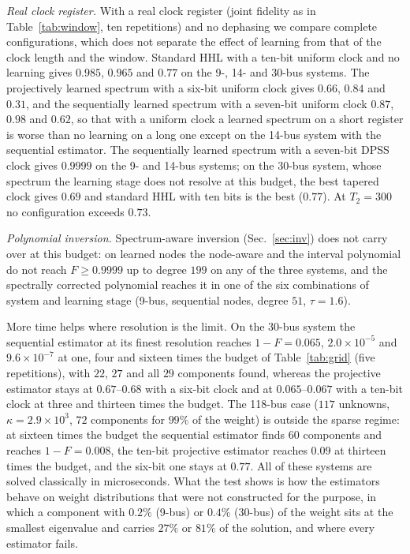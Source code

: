 \documentclass[journal]{IEEEtran}
\begin{document}
\emph{Real clock register.} With a real clock register (joint fidelity as in Table~\ref{tab:window}, ten repetitions) and no dephasing we compare complete configurations, which does not separate the effect of learning from that of the clock length and the window. Standard HHL with a ten-bit uniform clock and no learning gives $0.985$, $0.965$ and $0.77$ on the 9-, 14- and 30-bus systems. The projectively learned spectrum with a six-bit uniform clock gives $0.66$, $0.84$ and $0.31$, and the sequentially learned spectrum with a seven-bit uniform clock $0.87$, $0.98$ and $0.62$, so that with a uniform clock a learned spectrum on a short register is worse than no learning on a long one except on the 14-bus system with the sequential estimator. The sequentially learned spectrum with a seven-bit DPSS clock gives $0.9999$ on the 9- and 14-bus systems; on the 30-bus system, whose spectrum the learning stage does not resolve at this budget, the best tapered clock gives $0.69$ and standard HHL with ten bits is the best ($0.77$). At $T_2=300$ no configuration exceeds $0.73$.

\begin{sloppypar}
\emph{Polynomial inversion.} Spectrum-aware inversion (Sec.~\ref{sec:inv}) does not carry over at this budget: on learned nodes the node-aware and the interval polynomial do not reach $F\ge0.9999$ up to degree $199$ on any of the three systems, and the spectrally corrected polynomial reaches it in one of the six combinations of system and learning stage (9-bus, sequential nodes, degree $51$, $\tau=1.6$).
\end{sloppypar}

More time helps where resolution is the limit. On the 30-bus system the sequential estimator at its finest resolution reaches $1-F=0.065$, $2.0\times10^{-5}$ and $9.6\times10^{-7}$ at one, four and sixteen times the budget of Table~\ref{tab:grid} (five repetitions), with $22$, $27$ and all $29$ components found, whereas the projective estimator stays at $0.67$--$0.68$ with a six-bit clock and at $0.065$--$0.067$ with a ten-bit clock at three and thirteen times the budget. The 118-bus case ($117$ unknowns, $\kappa=2.9\times10^3$, $72$ components for $99\%$ of the weight) is outside the sparse regime: at sixteen times the budget the sequential estimator finds $60$ components and reaches $1-F=0.008$, the ten-bit projective estimator reaches $0.09$ at thirteen times the budget, and the six-bit one stays at $0.77$. All of these systems are solved classically in microseconds. What the test shows is how the estimators behave on weight distributions that were not constructed for the purpose, in which a component with $0.2\%$ (9-bus) or $0.4\%$ (30-bus) of the weight sits at the smallest eigenvalue and carries $27\%$ or $81\%$ of the solution, and where every estimator fails.
\end{document}
